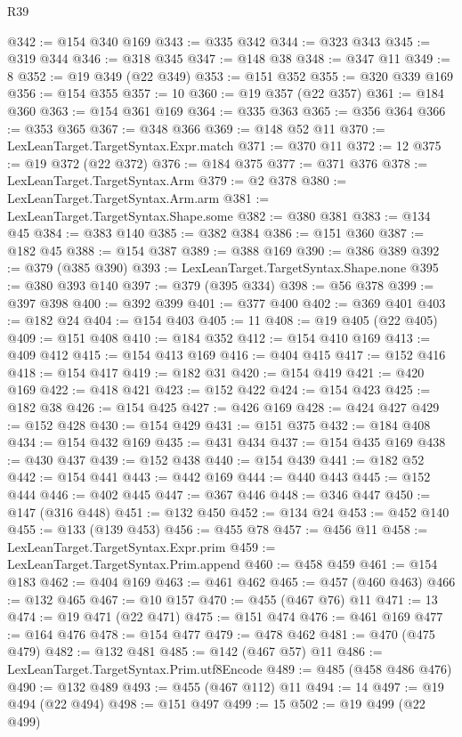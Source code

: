 \begin{lexlean}{R39}
\begin{coremodule}
@342 := @154 @340 @169
@343 := @335 @342
@344 := @323 @343
@345 := @319 @344
@346 := @318 @345
@347 := @148 @38
@348 := @347 @11
@349 := 8
@352 := @19 @349 (@22 @349)
@353 := @151 @352
@355 := @320 @339 @169
@356 := @154 @355
@357 := 10
@360 := @19 @357 (@22 @357)
@361 := @184 @360
@363 := @154 @361 @169
@364 := @335 @363
@365 := @356 @364
@366 := @353 @365
@367 := @348 @366
@369 := @148 @52 @11
@370 := LexLeanTarget.TargetSyntax.Expr.match
@371 := @370 @11
@372 := 12
@375 := @19 @372 (@22 @372)
@376 := @184 @375
@377 := @371 @376
@378 := LexLeanTarget.TargetSyntax.Arm
@379 := @2 @378
@380 := LexLeanTarget.TargetSyntax.Arm.arm
@381 := LexLeanTarget.TargetSyntax.Shape.some
@382 := @380 @381
@383 := @134 @45
@384 := @383 @140
@385 := @382 @384
@386 := @151 @360
@387 := @182 @45
@388 := @154 @387
@389 := @388 @169
@390 := @386 @389
@392 := @379 (@385 @390)
@393 := LexLeanTarget.TargetSyntax.Shape.none
@395 := @380 @393 @140
@397 := @379 (@395 @334)
@398 := @56 @378
@399 := @397 @398
@400 := @392 @399
@401 := @377 @400
@402 := @369 @401
@403 := @182 @24
@404 := @154 @403
@405 := 11
@408 := @19 @405 (@22 @405)
@409 := @151 @408
@410 := @184 @352
@412 := @154 @410 @169
@413 := @409 @412
@415 := @154 @413 @169
@416 := @404 @415
@417 := @152 @416
@418 := @154 @417
@419 := @182 @31
@420 := @154 @419
@421 := @420 @169
@422 := @418 @421
@423 := @152 @422
@424 := @154 @423
@425 := @182 @38
@426 := @154 @425
@427 := @426 @169
@428 := @424 @427
@429 := @152 @428
@430 := @154 @429
@431 := @151 @375
@432 := @184 @408
@434 := @154 @432 @169
@435 := @431 @434
@437 := @154 @435 @169
@438 := @430 @437
@439 := @152 @438
@440 := @154 @439
@441 := @182 @52
@442 := @154 @441
@443 := @442 @169
@444 := @440 @443
@445 := @152 @444
@446 := @402 @445
@447 := @367 @446
@448 := @346 @447
@450 := @147 (@316 @448)
@451 := @132 @450
@452 := @134 @24
@453 := @452 @140
@455 := @133 (@139 @453)
@456 := @455 @78
@457 := @456 @11
@458 := LexLeanTarget.TargetSyntax.Expr.prim
@459 := LexLeanTarget.TargetSyntax.Prim.append
@460 := @458 @459
@461 := @154 @183
@462 := @404 @169
@463 := @461 @462
@465 := @457 (@460 @463)
@466 := @132 @465
@467 := @10 @157
@470 := @455 (@467 @76) @11
@471 := 13
@474 := @19 @471 (@22 @471)
@475 := @151 @474
@476 := @461 @169
@477 := @164 @476
@478 := @154 @477
@479 := @478 @462
@481 := @470 (@475 @479)
@482 := @132 @481
@485 := @142 (@467 @57) @11
@486 := LexLeanTarget.TargetSyntax.Prim.utf8Encode
@489 := @485 (@458 @486 @476)
@490 := @132 @489
@493 := @455 (@467 @112) @11
@494 := 14
@497 := @19 @494 (@22 @494)
@498 := @151 @497
@499 := 15
@502 := @19 @499 (@22 @499)

\end{coremodule}
\end{lexlean}
